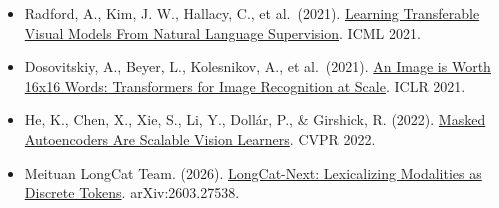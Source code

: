 \vspace{0.25em}
\begin{itemize}
\tightlist
\item
  Radford, A., Kim, J. W., Hallacy, C., et al.~(2021). \href{https://arxiv.org/abs/2103.00020}{Learning Transferable Visual Models From Natural Language Supervision}. ICML 2021.
\item
  Dosovitskiy, A., Beyer, L., Kolesnikov, A., et al.~(2021). \href{https://arxiv.org/abs/2010.11929}{An Image is Worth 16x16 Words: Transformers for Image Recognition at Scale}. ICLR 2021.
\item
  He, K., Chen, X., Xie, S., Li, Y., Dollár, P., \& Girshick, R. (2022). \href{https://arxiv.org/abs/2111.06377}{Masked Autoencoders Are Scalable Vision Learners}. CVPR 2022.
\item
  Meituan LongCat Team. (2026). \href{https://arxiv.org/abs/2603.27538}{LongCat-Next: Lexicalizing Modalities as Discrete Tokens}. arXiv:2603.27538.
\end{itemize}

\clearpage
